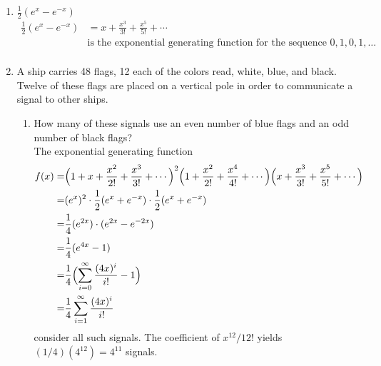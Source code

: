 \documentclass[a4paper]{article}
\begin{document}
\begin{enumerate}
\item $\frac{1}{2}(e^x-e^{-x})$
\begin{align*}
\frac{1}{2}(e^x-e^{-x})&=x+\frac{x^3}{3!}+\frac{x^5}{5!}+\cdots\\
&\text{is the exponential generating function for the sequence }0,1,0,1,\dots\\
\end{align*}

\item A ship carries 48 flags, 12 each of the colors read, white, blue, and black. Twelve of these flags are placed on a vertical pole in order to communicate a signal to other ships.
\begin{enumerate}[label=(\alph*)]
\item How many of these signals use an even number of blue flags and an odd number of black flags?\\
The exponential generating function
\begin{align*}
f(x)=&\Bigl(1+x+\frac{x^2}{2!}+\frac{x^3}{3!}+\cdots\Bigr)^2\Bigl(1+\frac{x^2}{2!}+\frac{x^4}{4!}+\cdots\Bigr)\Bigl(x+\frac{x^3}{3!}+\frac{x^5}{5!}+\cdots\Bigr)\\
=&(e^x)^2\cdot\frac{1}{2}(e^x+e^{-x})\cdot\frac{1}{2}(e^x+e^{-x})\\
=&\frac{1}{4}(e^{2x})\cdot(e^{2x}-e^{-2x})\\
=&\frac{1}{4}(e^{4x}-1)\\
=&\frac{1}{4}\Bigl(\sum_{i=0}^{\infty}{\frac{(4x)^i}{i!}}-1\Bigr)\\
=&\frac{1}{4}\sum_{i=1}^{\infty}{\frac{(4x)^i}{i!}}\\
\end{align*}
consider all such signals. The coefficient of ${x^{12}}/{12!}$ yields $(1/4)(4^{12})=4^{11}$ signals.
\end{enumerate}
\end{enumerate}
\end{document}
